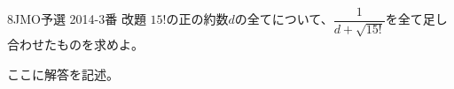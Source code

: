 \begin{prob}{8}{}{JMO予選 2014-3番 改題}
 $15!$の正の約数$d$の全てについて、$\dfrac{1}{d+\sqrt{15!}}$を全て足し合わせたものを求めよ。
\end{prob}
ここに解答を記述。